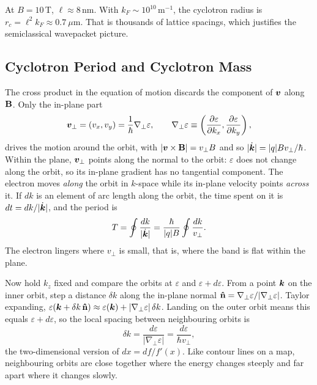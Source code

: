 \begin{example}
At $B = 10$\,T, $\ell\approx8$\,nm. With $k_F\sim10^{10}$\,m$^{-1}$, the cyclotron radius is $r_c = \ell^2k_F\approx0.7\ \mu$m. That is thousands of lattice spacings, which justifies the semiclassical wavepacket picture.
\end{example}

\subsection{Cyclotron Period and Cyclotron Mass}

The cross product in the equation of motion discards the component of $\bm{v}$ along $\cvect{B}$. Only the in-plane part
\begin{equation}
    \bm{v}_\perp = (v_x, v_y) = \frac{1}{\hbar}\nabla_\perp\varepsilon,
    \qquad
    \nabla_\perp\varepsilon \equiv \left(\pdv{\varepsilon}{k_x}, \pdv{\varepsilon}{k_y}\right),
\end{equation}
drives the motion around the orbit, with $|\lvect{v}\times\cvect{B}| = v_\perp B$ and so $|\dot{\bm{k}}| = |q|Bv_\perp/\hbar$. Within the plane, $\bm{v}_\perp$ points along the normal to the orbit: $\varepsilon$ does not change along the orbit, so its in-plane gradient has no tangential component. The electron moves \emph{along} the orbit in $k$-space while its in-plane velocity points \emph{across} it. If $dk$ is an element of arc length along the orbit, the time spent on it is $dt = dk/|\dot{\bm{k}}|$, and the period is
\begin{equation}
    T = \oint\frac{dk}{|\dot{\bm{k}}|} = \frac{\hbar}{|q|B}\oint\frac{dk}{v_\perp}.
    \label{eq:semi-T-loop}
\end{equation}
The electron lingers where $v_\perp$ is small, that is, where the band is flat within the plane.

Now hold $k_z$ fixed and compare the orbits at $\varepsilon$ and $\varepsilon + d\varepsilon$. From a point $\bm{k}$ on the inner orbit, step a distance $\delta k$ along the in-plane normal $\boldsymbol{\hat{\textbf{n}}} = \nabla_\perp\varepsilon/|\nabla_\perp\varepsilon|$. Taylor expanding, $\varepsilon(\bm{k} + \delta k\,\boldsymbol{\hat{\textbf{n}}}) \approx \varepsilon(\bm{k}) + |\nabla_\perp\varepsilon|\,\delta k$. Landing on the outer orbit means this equals $\varepsilon + d\varepsilon$, so the local spacing between neighbouring orbits is
\begin{equation}
    \delta k = \frac{d\varepsilon}{|\nabla_\perp\varepsilon|} = \frac{d\varepsilon}{\hbar v_\perp},
\end{equation}
the two-dimensional version of $dx = df/f'(x)$. Like contour lines on a map, neighbouring orbits are close together where the energy changes steeply and far apart where it changes slowly.

